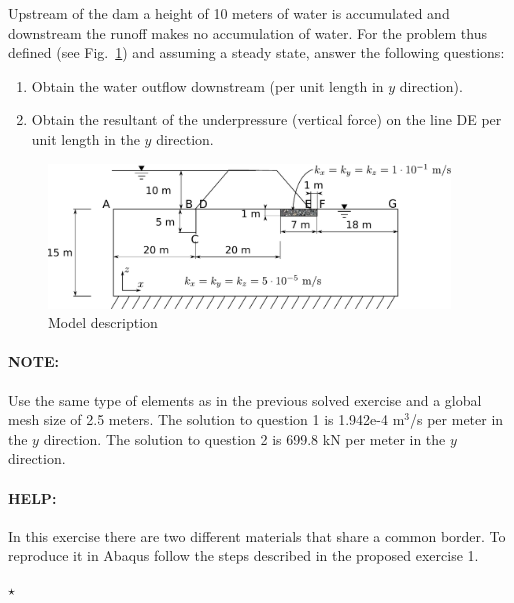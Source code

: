 Upstream of the dam a height of 10 meters of water is accumulated and
downstream the runoff makes no accumulation of water. For the problem
thus defined (see Fig.~\ref{enu03}) and assuming a steady state,
answer the following questions:
\begin{enumerate}
\item Obtain the water outflow downstream (per unit length in $y$
  direction).
\item Obtain the resultant of the underpressure (vertical force) on
  the line DE per unit length in the $y$ direction.
\end{enumerate}



\begin{figure}[!h]
  \begin{center}
    \includegraphics[width=0.95\textwidth]{./body/images/enu03}
  \end{center}
  \caption{Model description}
  \label{enu03}
\end{figure}

\paragraph{NOTE:} Use the same type of elements as in the previous
solved exercise and a global mesh size of 2.5 meters. The solution to
question 1 is 1.942e-4 m$^3$/s per meter in the $y$ direction. The
solution to question 2 is 699.8 kN per meter in the $y$ direction.

\paragraph{HELP:} In this exercise there are two different materials
that share a common border. To reproduce it in Abaqus follow the steps
described in the proposed exercise 1.

\hspace{20mm}\hrulefill$\star$\hrulefill\hspace{20mm}

\clearpage \newpage
